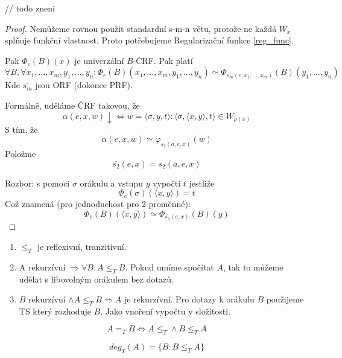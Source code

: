 \begin{theorem}\label{s_m_n_rel}
	// todo zneni
\end{theorem}
\begin{proof}
	Nemůžeme rovnou použit standardní s-m-n větu, protože ne každá $W_x$ splňuje funkční vlastnost.
	Proto potřebujeme Regularizační funkce \cref{reg_func}.

	Pak $\Phi_e(B)(x)$ je univerzální $B$-ČRF.
	Pak platí
	\[ \forall B, \forall x_1, \ldots, x_m, y_1, \ldots, y_n: \Phi_e(B)(x_1, \ldots, x_m, y_1, \ldots, y_n) \simeq \Phi_{\overline{s_m}(e, x_1, \ldots, x_m)}(B)(y_1, \ldots, y_n) \]
	Kde $\overline{s_m}$ jsou ORF (dokonce PRF).

	Formálně, uděláme ČRF takovou, že
	\[ \alpha(e, x, w) \downarrow \iff w = \langle \sigma, y, t \rangle: \langle \sigma, \langle x, y \rangle, t \rangle \in W_{\rho(x)} \]
	S tím, že
	\[ \alpha(e, x, w) \simeq \varphi_{s_2(a, e, x)}(w) \]
	Položme
	\[ \overline{s_2}(e, x) = s_2(a, e, x) \]

	Rozbor: s pomoci $\sigma$ orákulu a vstupu $y$ vypočti $t$ jestliže
	\[ \Phi_e(\sigma)(\langle x, y \rangle) = t \]
	Což znamená (pro jednoduchost pro 2 proměnné):
	\[ \Phi_e(B)(\langle x, y \rangle) \simeq \Phi_{\overline{s_2}(e, x)}(B)(y) \]
\end{proof}

\begin{properties}
	\begin{enumerate}
		\item $\leq_T$ je reflexivní, tranzitivní.
		\item A rekurzívní $\Rightarrow \forall B: A \leq_T B$.
		Pokud umíme spočítat $A$, tak to můžeme udělat s libovolným orákulem bez dotazů.
		\item $B$ rekurzívní $\land A \leq_T B \Rightarrow A$ je rekurzívní.
			Pro dotazy k orákulu $B$ použijeme TS který rozhoduje $B$.
			Jako vnoření vypočtu v složitosti.
	\end{enumerate}
\end{properties}

\begin{definition}
	\[ A =_T B \iff A \leq_T \land B \leq_T A \]
\end{definition}

\begin{definition}
	\[ deg_T(A) = \{ B: B \leq_T A \} \]
\end{definition}

